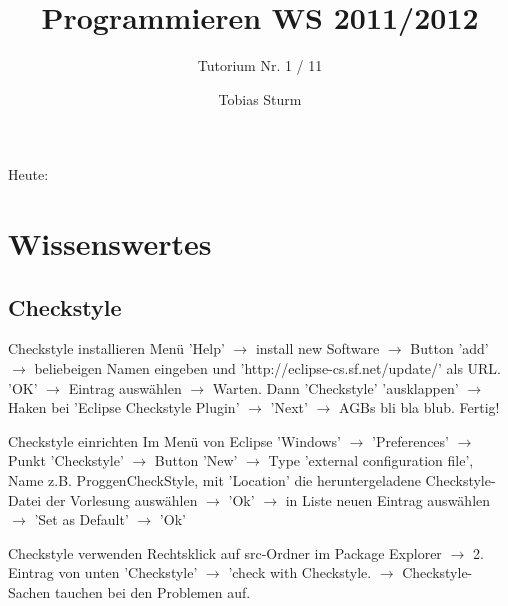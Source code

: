 \documentclass[18pt]{beamer}
\title[Proggen WS11/12]{Programmieren WS 2011/2012}
\subtitle{Tutorium Nr. 1 / 11}
\author{Tobias Sturm} %
\institute{Zertifizierbare Vertrauenswürdige Informatiksysteme}
\date[23.1.12] %
\begin{document}


\begin{frame}
	\titlepage
\end{frame}


\begin{frame}{Heute:}
	\tableofcontents
\end{frame}


\section{Wissenswertes}
\subsection{Checkstyle}
\begin{frame}{Checkstyle installieren}
	Menü 'Help' $\rightarrow$ install new Software $\rightarrow$ Button 'add' $\rightarrow$ beliebeigen Namen eingeben und 'http://eclipse-cs.sf.net/update/' als URL. 'OK' $\rightarrow$ Eintrag auswählen $\rightarrow$ Warten. Dann 'Checkstyle' 'ausklappen' $\rightarrow$ Haken bei 'Eclipse Checkstyle Plugin' $\rightarrow$ 'Next' $\rightarrow$ AGBs bli bla blub. Fertig!
\end{frame}


\begin{frame}{Checkstyle einrichten}
	Im Menü von Eclipse 'Windows' $\rightarrow$ 'Preferences' $\rightarrow$ Punkt 'Checkstyle' $\rightarrow$ Button 'New' $\rightarrow$ Type 'external configuration file', Name z.B. ProggenCheckStyle, mit 'Location' die heruntergeladene Checkstyle-Datei der Vorlesung auswählen $\rightarrow$ 'Ok' $\rightarrow$ in Liste neuen Eintrag auswählen $\rightarrow$ 'Set as Default' $\rightarrow$ 'Ok'
\end{frame}


\begin{frame}{Checkstyle verwenden}
	Rechtsklick auf src-Ordner im Package Explorer $\rightarrow$ 2. Eintrag von unten 'Checkstyle' $\rightarrow$ 'check with Checkstyle. $\rightarrow$ Checkstyle-Sachen tauchen bei den Problemen auf.
\end{frame}
\end{document}

